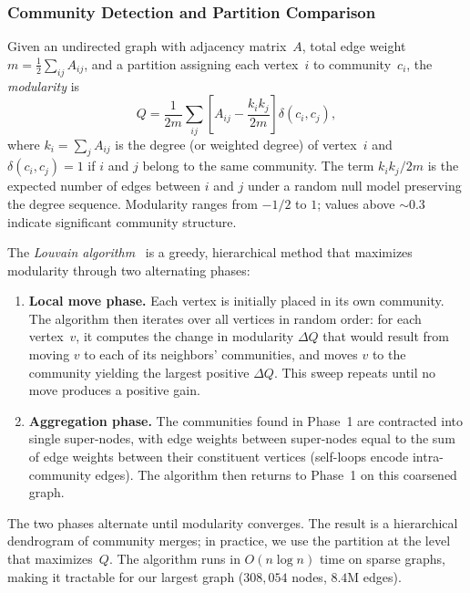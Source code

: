 \subsubsection{Community Detection and Partition Comparison}
\label{sec:prelim-community}

\begin{definition}
\label{def:modularity}
Given an undirected graph with adjacency matrix~$A$, total edge weight $m = \frac{1}{2}\sum_{ij} A_{ij}$, and a partition assigning each vertex~$i$ to community~$c_i$, the \emph{modularity} is
\[
  Q = \frac{1}{2m} \sum_{ij} \left[ A_{ij} - \frac{k_i k_j}{2m} \right] \delta(c_i, c_j),
\]
where $k_i = \sum_j A_{ij}$ is the degree (or weighted degree) of vertex~$i$ and $\delta(c_i, c_j) = 1$ if $i$ and $j$ belong to the same community. The term $k_i k_j / 2m$ is the expected number of edges between $i$ and $j$ under a random null model preserving the degree sequence. Modularity ranges from $-1/2$ to $1$; values above ${\sim}0.3$ indicate significant community structure.
\end{definition}

The \emph{Louvain algorithm}~\cite{blondel2008} is a greedy, hierarchical method that maximizes modularity through two alternating phases:

\begin{enumerate}
\item \textbf{Local move phase.} Each vertex is initially placed in its own community. The algorithm then iterates over all vertices in random order: for each vertex~$v$, it computes the change in modularity $\Delta Q$ that would result from moving $v$ to each of its neighbors' communities, and moves $v$ to the community yielding the largest positive $\Delta Q$. This sweep repeats until no move produces a positive gain.

\item \textbf{Aggregation phase.} The communities found in Phase~1 are contracted into single super-nodes, with edge weights between super-nodes equal to the sum of edge weights between their constituent vertices (self-loops encode intra-community edges). The algorithm then returns to Phase~1 on this coarsened graph.
\end{enumerate}

\noindent
The two phases alternate until modularity converges. The result is a hierarchical dendrogram of community merges; in practice, we use the partition at the level that maximizes~$Q$. The algorithm runs in $O(n \log n)$ time on sparse graphs, making it tractable for our largest graph ($308{,}054$ nodes, $8.4$M edges).


